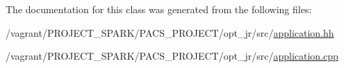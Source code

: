 The documentation for this class was generated from the following files\-:\begin{DoxyCompactItemize}
\item 
/vagrant/\-P\-R\-O\-J\-E\-C\-T\-\_\-\-S\-P\-A\-R\-K/\-P\-A\-C\-S\-\_\-\-P\-R\-O\-J\-E\-C\-T/opt\-\_\-jr/src/\hyperlink{application_8hh}{application.\-hh}\item 
/vagrant/\-P\-R\-O\-J\-E\-C\-T\-\_\-\-S\-P\-A\-R\-K/\-P\-A\-C\-S\-\_\-\-P\-R\-O\-J\-E\-C\-T/opt\-\_\-jr/src/\hyperlink{application_8cpp}{application.\-cpp}\end{DoxyCompactItemize}
